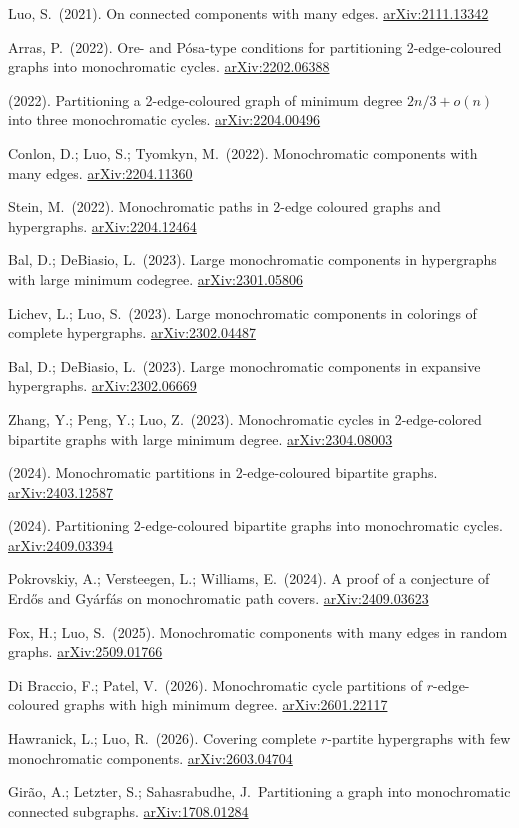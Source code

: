 \documentclass[12pt,a4paper,twoside,openright]{book}
\theoremstyle{definition}
\newcommand{\arxiv}[1]{\href{https://arxiv.org/abs/#1}{\textcolor{linkcolor}{arXiv:#1}}}
\begin{document}
\begin{enumerate}[label={[\arabic*]}, leftmargin=2cm]
\item Luo, S.\ (2021). On connected components with many edges. \arxiv{2111.13342}

\item Arras, P.\ (2022). Ore- and Pósa-type conditions for partitioning 2-edge-coloured graphs into monochromatic cycles. \arxiv{2202.06388}

\item (2022). Partitioning a 2-edge-coloured graph of minimum degree $2n/3+o(n)$ into three monochromatic cycles. \arxiv{2204.00496}

\item Conlon, D.; Luo, S.; Tyomkyn, M.\ (2022). Monochromatic components with many edges. \arxiv{2204.11360}

\item Stein, M.\ (2022). Monochromatic paths in 2-edge coloured graphs and hypergraphs. \arxiv{2204.12464}

\item Bal, D.; DeBiasio, L.\ (2023). Large monochromatic components in hypergraphs with large minimum codegree. \arxiv{2301.05806}

\item Lichev, L.; Luo, S.\ (2023). Large monochromatic components in colorings of complete hypergraphs. \arxiv{2302.04487}

\item Bal, D.; DeBiasio, L.\ (2023). Large monochromatic components in expansive hypergraphs. \arxiv{2302.06669}

\item Zhang, Y.; Peng, Y.; Luo, Z.\ (2023). Monochromatic cycles in 2-edge-colored bipartite graphs with large minimum degree. \arxiv{2304.08003}

\item (2024). Monochromatic partitions in 2-edge-coloured bipartite graphs. \arxiv{2403.12587}

\item (2024). Partitioning 2-edge-coloured bipartite graphs into monochromatic cycles. \arxiv{2409.03394}

\item Pokrovskiy, A.; Versteegen, L.; Williams, E.\ (2024). A proof of a conjecture of Erdős and Gyárfás on monochromatic path covers. \arxiv{2409.03623}

\item Fox, H.; Luo, S.\ (2025). Monochromatic components with many edges in random graphs. \arxiv{2509.01766}

\item Di Braccio, F.; Patel, V.\ (2026). Monochromatic cycle partitions of $r$-edge-coloured graphs with high minimum degree. \arxiv{2601.22117}

\item Hawranick, L.; Luo, R.\ (2026). Covering complete $r$-partite hypergraphs with few monochromatic components. \arxiv{2603.04704}

\item Girão, A.; Letzter, S.; Sahasrabudhe, J.\ Partitioning a graph into monochromatic connected subgraphs. \arxiv{1708.01284}

\end{enumerate}
\end{document}
